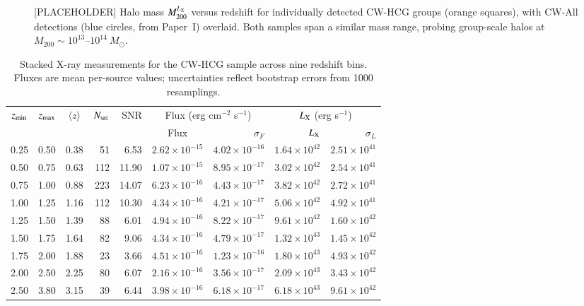 \documentclass{aa}
\begin{document}
\begin{figure}
\centering
\caption{[PLACEHOLDER] Halo mass $M_{200}^{L_{\rm X}}$ versus redshift for individually detected CW-HCG groups (orange squares), with CW-All detections (blue circles, from Paper~I) overlaid. Both samples span a similar mass range, probing group-scale halos at $M_{200} \sim 10^{13}$--$10^{14}~M_{\odot}$.}
\label{fig:M200_hcg}
\end{figure}

\begin{table}
\caption{Stacked X-ray measurements for the CW-HCG sample across nine redshift bins. Fluxes are mean per-source values; uncertainties reflect bootstrap errors from 1000 resamplings.}
\label{tab:stacking_hcg}
\centering
\begin{tabular}{cccrrcrrr}
\hline\hline
$z_{\rm min}$ & $z_{\rm max}$ & $\langle z \rangle$ & $N_{\rm src}$ & SNR & \multicolumn{2}{c}{Flux (erg cm$^{-2}$ s$^{-1}$)} & \multicolumn{2}{c}{$L_{\rm X}$ (erg s$^{-1}$)} \\
 &  &  &  &  & Flux & $\sigma_F$ & $L_{\rm X}$ & $\sigma_L$ \\
\hline
0.25 & 0.50 & 0.38 &  51 &  6.53 & $2.62\times10^{-15}$ & $4.02\times10^{-16}$ & $1.64\times10^{42}$ & $2.51\times10^{41}$ \\
0.50 & 0.75 & 0.63 & 112 & 11.90 & $1.07\times10^{-15}$ & $8.95\times10^{-17}$ & $3.02\times10^{42}$ & $2.54\times10^{41}$ \\
0.75 & 1.00 & 0.88 & 223 & 14.07 & $6.23\times10^{-16}$ & $4.43\times10^{-17}$ & $3.82\times10^{42}$ & $2.72\times10^{41}$ \\
1.00 & 1.25 & 1.16 & 112 & 10.30 & $4.34\times10^{-16}$ & $4.21\times10^{-17}$ & $5.06\times10^{42}$ & $4.92\times10^{41}$ \\
1.25 & 1.50 & 1.39 &  88 &  6.01 & $4.94\times10^{-16}$ & $8.22\times10^{-17}$ & $9.61\times10^{42}$ & $1.60\times10^{42}$ \\
1.50 & 1.75 & 1.64 &  82 &  9.06 & $4.34\times10^{-16}$ & $4.79\times10^{-17}$ & $1.32\times10^{43}$ & $1.45\times10^{42}$ \\
1.75 & 2.00 & 1.88 &  23 &  3.66 & $4.51\times10^{-16}$ & $1.23\times10^{-16}$ & $1.80\times10^{43}$ & $4.93\times10^{42}$ \\
2.00 & 2.50 & 2.25 &  80 &  6.07 & $2.16\times10^{-16}$ & $3.56\times10^{-17}$ & $2.09\times10^{43}$ & $3.43\times10^{42}$ \\
2.50 & 3.80 & 3.15 &  39 &  6.44 & $3.98\times10^{-16}$ & $6.18\times10^{-17}$ & $6.18\times10^{43}$ & $9.61\times10^{42}$ \\
\hline
\end{tabular}
\end{table}
\end{document}
